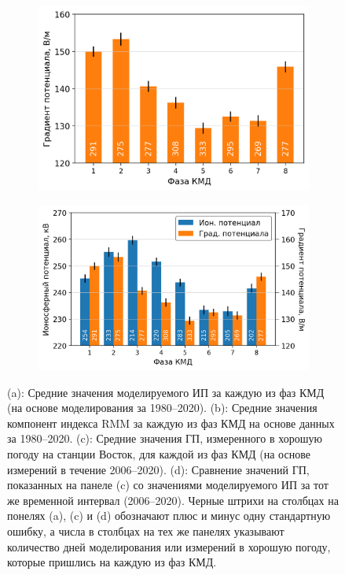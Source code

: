 \begin{figure}
\begin{subfigure}[tb]{.49\textwidth}
		\includegraphics[width=\textwidth]{figures/pg_vs_mjo_phase.png}
		\caption{}
		\label{fig:pg_vs_mjo_phase}
	\end{subfigure}
	\hfill
	\begin{subfigure}[tb]{.49\textwidth}
		\centering
		\includegraphics[width=\textwidth]{figures/ip_pg_vs_mjo_phase.png}
		\caption{}
		\label{fig:ip_pg_vs_mjo_phase}
	\end{subfigure}
    \caption{(a): Средние значения моделируемого ИП за каждую из фаз КМД (на основе моделирования за 1980--2020). (b): Средние значения компонент индекса RMM за каждую из фаз КМД на основе данных за 1980--2020. (c): Средние значения ГП, измеренного в хорошую погоду на станции Восток, для каждой из фаз КМД (на основе измерений в течение 2006--2020). (d): Сравнение значений ГП, показанных на панеле (c) со значениями моделируемого ИП за тот же временной интервал (2006--2020). Черные штрихи на столбцах на понелях (a), (c) и (d) обозначают плюс и минус одну стандартную ошибку, а числа в столбцах на тех же панелях указывают количество дней моделирования или измерений в хорошую погоду, которые пришлись на каждую из фаз КМД.}
    \label{fig:variations}
\end{figure}

